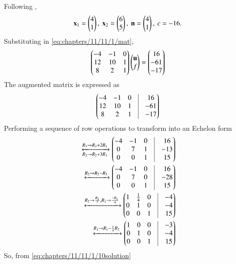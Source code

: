 	Following 
,
\begin{align}
	\label{eq:chapters/11/11/1/10circPoints}
	\mathbf{x}_{1} = \begin{pmatrix}4\\1\end{pmatrix},\ \mathbf{x}_{2} = \begin{pmatrix}6\\5\end{pmatrix},\
	\mathbf{n} = \begin{pmatrix}4 \\ 1\end{pmatrix},\  c= -16.
\end{align}
Substituting  in
	\eqref{eq:chapters/11/11/1/mat},
\begin{align}
	\begin{pmatrix}-4 & -1 & 0\\
	       12 & 10 & 1\\
	        8 &  2 & 1\end{pmatrix}
	\begin{pmatrix}\mathbf{u}\\f\end{pmatrix} = 
	\begin{pmatrix}16 \\ -61 \\ -17\end{pmatrix}
\end{align}
The augmented matrix is expressed as
\begin{align}
	\myvec{-4 & -1 & 0 & \vrule & 16\\
	       12 & 10 & 1 & \vrule & -61\\
	        8 &  2 & 1 & \vrule & -17}
\end{align}
Performing a sequence of row operations to transform into an Echelon form
\begin{align}
	\xleftrightarrow[R_2\rightarrow R_2+3R_1]{{R_3\rightarrow R_3+2R_1}}
	\myvec{-4 & -1 & 0 & \vrule & 16\\
	        0 &  7 & 1 & \vrule & -13\\
	        0 &  0 & 1 & \vrule & 15}\\
	\xleftrightarrow[]{{R_2\rightarrow R_2-R_3}}
	\myvec{-4 & -1 & 0 & \vrule & 16\\
	        0 &  7 & 0 & \vrule & -28\\
	        0 &  0 & 1 & \vrule & 15}\\
	\xleftrightarrow[]{{R_2\rightarrow \frac{R_2}{7},R_1\rightarrow \frac{-R_1}{4}}}
	\myvec{ 1 & \frac{1}{4} & 0 & \vrule & -4\\
	        0 &  1 & 0 & \vrule & -4\\
	        0 &  0 & 1 & \vrule & 15}\\
	\label{eq:chapters/11/11/1/10solution}	
	\xleftrightarrow[]{{R_1\rightarrow R_1-\frac{1}{4}R_2}}
	\myvec{ 1 &  0 & 0 & \vrule & -3\\
	        0 &  1 & 0 & \vrule & -4\\
	        0 &  0 & 1 & \vrule & 15}
\end{align}
So, from \eqref{eq:chapters/11/11/1/10solution}
